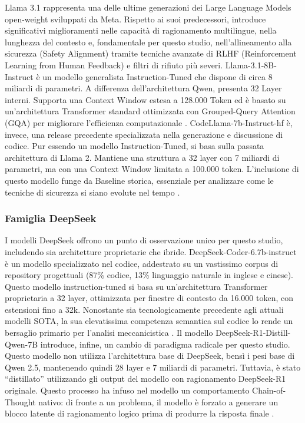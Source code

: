 Llama 3.1 rappresenta una delle ultime generazioni dei Large Language Models open-weight sviluppati da Meta. Rispetto ai suoi predecessori, introduce significativi miglioramenti nelle capacità di ragionamento multilingue, nella lunghezza del contesto e, fondamentale per questo studio, nell'allineamento alla sicurezza (Safety Alignment) tramite tecniche avanzate di RLHF (Reinforcement Learning from Human Feedback) e filtri di rifiuto più severi.
Llama-3.1-8B-Instruct è un modello generalista Instruction-Tuned che dispone di circa 8 miliardi di parametri. A differenza dell'architettura Qwen, presenta 32 Layer interni. Supporta una Context Window estesa a 128.000 Token ed è basato su un'architettura Transformer standard ottimizzata con Grouped-Query Attention (GQA) per migliorare l'efficienza computazionale \cite{Llama-3.1-8B-Instruct-hf}.
CodeLlama-7b-Instruct-hf è, invece, una release precedente specializzata nella generazione e discussione di codice. Pur essendo un modello Instruction-Tuned, si basa sulla passata architettura di Llama 2. Mantiene una struttura a 32 layer con 7 miliardi di parametri, ma con una Context Window limitata a 100.000 token. L'inclusione di questo modello funge da Baseline storica, essenziale per analizzare come le tecniche di sicurezza si siano evolute nel tempo \cite{CodeLlama-7b-Instruct-hf}.

\subsubsection{Famiglia DeepSeek}

I modelli DeepSeek offrono un punto di osservazione unico per questo studio, includendo sia architetture proprietarie che ibride.
DeepSeek-Coder-6.7b-instruct è un modello specializzato nel codice, addestrato su un vastissimo corpus di repository progettuali (87\% codice, 13\% linguaggio naturale in inglese e cinese). Questo modello instruction-tuned si basa su un'architettura Transformer proprietaria a 32 layer, ottimizzata per finestre di contesto da 16.000 token, con estensioni fino a 32k. Nonostante sia tecnologicamente precedente agli attuali modelli SOTA, la sua elevatissima competenza semantica sul codice lo rende un bersaglio primario per l'analisi meccanicistica \cite{deepseekai2025deepseekr1incentivizingreasoningcapability-hf}.
Il modello DeepSeek-R1-Distill-Qwen-7B introduce, infine, un cambio di paradigma radicale per questo studio. Questo modello non utilizza l'architettura base di DeepSeek, bensì i pesi base di Qwen 2.5, mantenendo quindi 28 layer e 7 miliardi di parametri. Tuttavia, è stato \enquote{distillato} utilizzando gli output del modello con ragionamento DeepSeek-R1 originale. Questo processo ha infuso nel modello un comportamento Chain-of-Thought nativo: di fronte a un problema, il modello è forzato a generare un blocco latente di ragionamento logico prima di produrre la risposta finale \cite{deepseek-coder-6.7b-instruct-hf}.